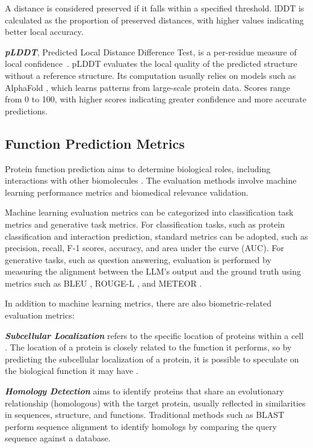 A distance is considered preserved if it falls within a specified threshold. lDDT is calculated as the proportion of preserved distances, with higher values indicating better local accuracy. 

\smallskip\noindent \textit{\textbf{pLDDT}}, Predicted Local Distance Difference Test, is a per-residue measure of local confidence~\cite{guo2022alphafold2}. pLDDT evaluates the local quality of the predicted structure without a reference structure. Its computation usually relies on models such as AlphaFold \cite{jumper2021highly}, which learns patterns from large-scale protein data. Scores range from 0 to 100, with higher scores indicating greater confidence and more accurate predictions.

\subsection{Function Prediction Metrics}
Protein function prediction aims to determine biological roles, including interactions with other biomolecules \cite{radivojac2013large}. The evaluation methods involve machine learning performance metrics and biomedical relevance validation.

Machine learning evaluation metrics can be categorized into classification task metrics and generative task metrics. For classification tasks, such as protein classification and interaction prediction, standard metrics can be adopted, such as precision, recall, F-1 scores, accuracy, and area under the curve (AUC). For generative tasks, such as question answering, evaluation is performed by measuring the alignment between the LLM's output and the ground truth using metrics such as BLEU \cite{papineni2002bleu}, ROUGE-L \cite{lin2004rouge}, and METEOR \cite{banerjee2005meteor}.


In addition to machine learning metrics, there are also biometric-related evaluation metrics:

\smallskip\noindent \textit{\textbf{Subcellular Localization}} refers to the specific location of proteins within a cell \cite{briesemeister2010yloc}. The location of a protein is closely related to the function it performs, so by predicting the subcellular localization of a protein, it is possible to speculate on the biological function it may have \cite{holm2020dali}.

\smallskip\noindent \textit{\textbf{Homology Detection}} aims to identify proteins that share an evolutionary relationship (homologous) with the target protein, usually reflected in similarities in  sequences, structure, and functions. Traditional methods such as BLAST \cite{altschul1990basic} 
perform sequence alignment to identify homologs by comparing the query sequence against a database.

